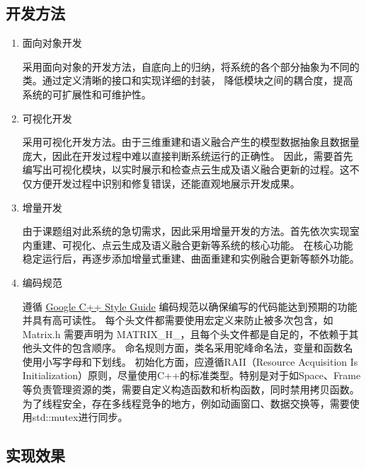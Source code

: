 
\subsection{开发方法}

\begin{enumerate}
	\item{面向对象开发}
	\par 采用面向对象的开发方法，自底向上的归纳，将系统的各个部分抽象为不同的类。通过定义清晰的接口和实现详细的封装，
	降低模块之间的耦合度，提高系统的可扩展性和可维护性。

	\item{可视化开发}
	\par 采用可视化开发方法。由于三维重建和语义融合产生的模型数据抽象且数据量庞大，因此在开发过程中难以直接判断系统运行的正确性。
	因此，需要首先编写出可视化模块，以实时展示和检查点云生成及语义融合更新的过程。这不仅方便开发过程中识别和修复错误，还能直观地展示开发成果。

	\item{增量开发}
	\par 由于课题组对此系统的急切需求，因此采用增量开发的方法。首先依次实现室内重建、可视化、点云生成及语义融合更新等系统的核心功能。
	在核心功能稳定运行后，再逐步添加增量式重建、曲面重建和实例融合更新等额外功能。

	\item{编码规范}
	\par 遵循 \href{https://google.github.io/styleguide/cppguide.html}{Google C++ Style Guide} 编码规范以确保编写的代码能达到预期的功能并具有高可读性。
	每个头文件都需要使用宏定义来防止被多次包含，如 Matrix.h 需要声明为 MATRIX\_H\_，且每个头文件都是自足的，不依赖于其他头文件的包含顺序。
	命名规则方面，类名采用驼峰命名法，变量和函数名使用小写字母和下划线。
	初始化方面，应遵循RAII（Resource Acquisition Is Initialization）原则，尽量使用C++的标准类型。特别是对于如Space、Frame等负责管理资源的类，需要自定义构造函数和析构函数，同时禁用拷贝函数。
	为了线程安全，存在多线程竞争的地方，例如动画窗口、数据交换等，需要使用std::mutex进行同步。
\end{enumerate}

\subsection{实现效果}

